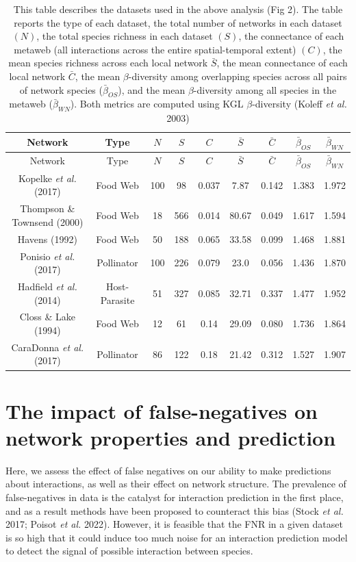 \documentclass[10pt,oneside]{article}
\begin{document}
\hypertarget{tbl:id}{}
\begin{longtable}[]{@{}ccccccccc@{}}
\caption{\label{tbl:id}This table describes the datasets used in the
above analysis (Fig 2). The table reports the type of each dataset, the
total number of networks in each dataset \((N)\), the total species
richness in each dataset \((S)\), the connectance of each metaweb (all
interactions across the entire spatial-temporal extent) \((C)\), the
mean species richness across each local network \(\bar{S}\), the mean
connectance of each local network \(\bar{C}\), the mean
\(\beta\)-diversity among overlapping species across all pairs of
network species (\(\bar{\beta}_{OS}\)), and the mean \(\beta\)-diversity
among all species in the metaweb (\(\bar{\beta}_{WN}\)). Both metrics
are computed using KGL \(\beta\)-diversity (Koleff \emph{et al.}
2003)}\tabularnewline
\toprule
Network & Type & \(N\) & \(S\) & \(C\) & \(\bar{S}\) & \(\bar{C}\) &
\(\bar{\beta}_{OS}\) & \(\bar{\beta}_{WN}\)\tabularnewline
\midrule
\endfirsthead
\toprule
Network & Type & \(N\) & \(S\) & \(C\) & \(\bar{S}\) & \(\bar{C}\) &
\(\bar{\beta}_{OS}\) & \(\bar{\beta}_{WN}\)\tabularnewline
\midrule
\endhead
Kopelke \emph{et al.} (2017) & Food Web & 100 & 98 & 0.037 & 7.87 &
0.142 & 1.383 & 1.972\tabularnewline
Thompson \& Townsend (2000) & Food Web & 18 & 566 & 0.014 & 80.67 &
0.049 & 1.617 & 1.594\tabularnewline
Havens (1992) & Food Web & 50 & 188 & 0.065 & 33.58 & 0.099 & 1.468 &
1.881\tabularnewline
Ponisio \emph{et al.} (2017) & Pollinator & 100 & 226 & 0.079 & 23.0 &
0.056 & 1.436 & 1.870\tabularnewline
Hadfield \emph{et al.} (2014) & Host-Parasite & 51 & 327 & 0.085 & 32.71
& 0.337 & 1.477 & 1.952\tabularnewline
Closs \& Lake (1994) & Food Web & 12 & 61 & 0.14 & 29.09 & 0.080 & 1.736
& 1.864\tabularnewline
CaraDonna \emph{et al.} (2017) & Pollinator & 86 & 122 & 0.18 & 21.42 &
0.312 & 1.527 & 1.907\tabularnewline
\bottomrule
\end{longtable}

\hypertarget{the-impact-of-false-negatives-on-network-properties-and-prediction}{%
\section{The impact of false-negatives on network properties and
prediction}\label{the-impact-of-false-negatives-on-network-properties-and-prediction}}

Here, we assess the effect of false negatives on our ability to make
predictions about interactions, as well as their effect on network
structure. The prevalence of false-negatives in data is the catalyst for
interaction prediction in the first place, and as a result methods have
been proposed to counteract this bias (Stock \emph{et al.} 2017; Poisot
\emph{et al.} 2022). However, it is feasible that the FNR in a given
dataset is so high that it could induce too much noise for an
interaction prediction model to detect the signal of possible
interaction between species.
\end{document}
